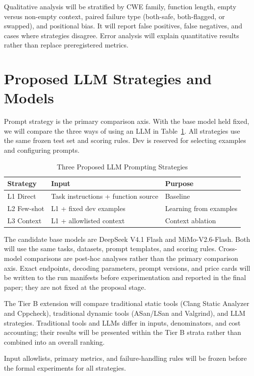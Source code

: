 \documentclass[conference]{IEEEtran}
\begin{document}
Qualitative analysis will be stratified by CWE family, function length, empty versus non-empty context, paired failure type (both-safe, both-flagged, or swapped), and positional bias. It will report false positives, false negatives, and cases where strategies disagree. Error analysis will explain quantitative results rather than replace preregistered metrics.

\section{Proposed LLM Strategies and Models}
\label{sec:approaches}

Prompt strategy is the primary comparison axis. With the base model held fixed, we will compare the three ways of using an LLM in Table~\ref{tab:approaches}. All strategies use the same frozen test set and scoring rules. Dev is reserved for selecting examples and configuring prompts.

\begin{table}[t]
\caption{Three Proposed LLM Prompting Strategies}
\label{tab:approaches}
\centering
\small
\setlength{\tabcolsep}{4pt}
\begin{tabularx}{\columnwidth}{@{}l>{\raggedright\arraybackslash}X>{\raggedright\arraybackslash}p{0.79in}@{}}
\toprule
Strategy & Input & Purpose\\
\midrule
L1 Direct & Task instructions + function source & Baseline\\
L2 Few-shot & L1 + fixed dev examples & Learning from examples\\
L3 Context & L1 + allowlisted context & Context ablation\\
\bottomrule
\end{tabularx}
\end{table}

The candidate base models are DeepSeek V4.1 Flash and MiMo-V2.6-Flash. Both will use the same tasks, datasets, prompt templates, and scoring rules. Cross-model comparisons are post-hoc analyses rather than the primary comparison axis. Exact endpoints, decoding parameters, prompt versions, and price cards will be written to the run manifests before experimentation and reported in the final paper; they are not fixed at the proposal stage.

The Tier B extension will compare traditional static tools (Clang Static Analyzer and Cppcheck), traditional dynamic tools (ASan/LSan and Valgrind), and LLM strategies. Traditional tools and LLMs differ in inputs, denominators, and cost accounting; their results will be presented within the Tier B strata rather than combined into an overall ranking.

Input allowlists, primary metrics, and failure-handling rules will be frozen before the formal experiments for all strategies.

\balance


\end{document}
